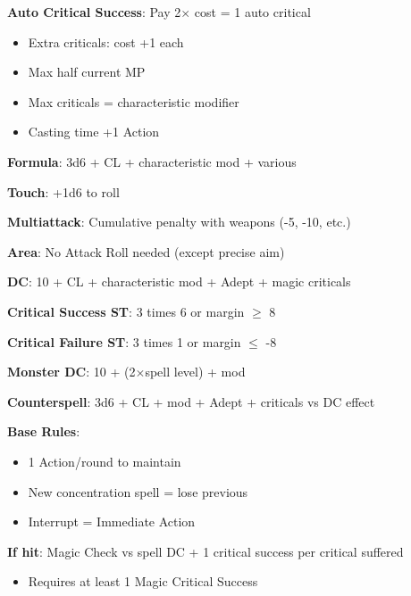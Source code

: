 \documentclass[10pt,a4paper,landscape]{article}
\begin{document}
\begin{multicols}{3}
\begin{tcolorbox}[title=ENHANCING MAGIC CHECKS]
			\textbf{Auto Critical Success}: Pay 2$\times$ cost = 1 auto critical
			\begin{itemize}[leftmargin=*,noitemsep]
				\item Extra criticals: cost +1 each
				\item Max half current MP
				\item Max criticals = characteristic modifier
				\item Casting time +1 Action
			\end{itemize}
		\end{tcolorbox}
		
		\begin{tcolorbox}[title=SPELL ATTACK ROLLS]
			\textbf{Formula}: 3d6 + CL + characteristic mod + various
			
			\textbf{Touch}: +1d6 to roll
			
			\textbf{Multiattack}: Cumulative penalty with weapons (-5, -10, etc.)
			
			\textbf{Area}: No Attack Roll needed (except precise aim)
		\end{tcolorbox}
		
		\begin{tcolorbox}[title=SPELL SAVING THROWS]
			\textbf{DC}: 10 + CL + characteristic mod + Adept + magic criticals
			
			\textcolor{successcolor}{\textbf{Critical Success ST}}: 3 times 6 or margin $\geq$ 8
			
			\textcolor{criticalcolor}{\textbf{Critical Failure ST}}: 3 times 1 or margin $\leq$ -8
			
			\textbf{Monster DC}: 10 + (2$\times$spell level) + mod
			
			\textbf{Counterspell}: 3d6 + CL + mod + Adept + criticals vs DC effect
		\end{tcolorbox}
		
		\begin{tcolorbox}[title=CONCENTRATION]
			\textbf{Base Rules}:
			\begin{itemize}[leftmargin=*,noitemsep]
				\item 1 Action/round to maintain
				\item New concentration spell = lose previous
				\item Interrupt = Immediate Action
			\end{itemize}
			
			\textbf{If hit}: Magic Check vs spell DC + 1 critical success per critical suffered
			\begin{itemize}[leftmargin=*,noitemsep]
				\item Requires at least 1 Magic Critical Success
			\end{itemize}
			

\end{tcolorbox}
\end{multicols}
\end{document}
